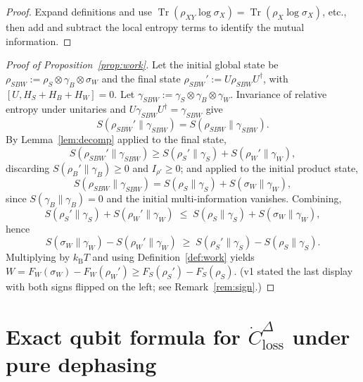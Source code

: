 \documentclass[11pt,a4paper]{article}
\theoremstyle{plain}
\theoremstyle{definition}
\theoremstyle{remark}
\newcommand{\Tr}{\operatorname{Tr}}
\newcommand{\kB}{k_{\mathrm{B}}}
\newcommand{\Closs}{\dot{C}^{\Delta}_{\mathrm{loss}}}
\begin{document}
\begin{proof}
Expand definitions and use
$\Tr(\rho_{XY}\log\sigma_X) = \Tr(\rho_X\log\sigma_X)$, etc., then add and
subtract the local entropy terms to identify the mutual information.
\end{proof}

\begin{proof}[Proof of Proposition~\ref{prop:work}]
Let the initial global state be $\rho_{SBW} := \rho_S \otimes \gamma_B \otimes
\sigma_W$ and the final state $\rho_{SBW}' := U\rho_{SBW}U^\dagger$, with
$[U, H_S + H_B + H_W] = 0$. Let $\gamma_{SBW} := \gamma_S \otimes \gamma_B
\otimes \gamma_W$. Invariance of relative entropy under unitaries and
$U\gamma_{SBW}U^\dagger = \gamma_{SBW}$ give
\begin{equation}
S(\rho_{SBW}'\|\gamma_{SBW}) = S(\rho_{SBW}\|\gamma_{SBW}).
\end{equation}
By Lemma~\ref{lem:decomp} applied to the final state,
\begin{equation}
S(\rho_{SBW}'\|\gamma_{SBW}) \ge S(\rho_S'\|\gamma_S) +
S(\rho_W'\|\gamma_W),
\end{equation}
discarding $S(\rho_B'\|\gamma_B) \ge 0$ and $I_{\rho'} \ge 0$; and applied to
the initial product state,
\begin{equation}
S(\rho_{SBW}\|\gamma_{SBW}) = S(\rho_S\|\gamma_S) + S(\sigma_W\|\gamma_W),
\end{equation}
since $S(\gamma_B\|\gamma_B) = 0$ and the initial multi-information vanishes.
Combining,
\begin{equation}
S(\rho_S'\|\gamma_S) + S(\rho_W'\|\gamma_W) \;\le\; S(\rho_S\|\gamma_S) +
S(\sigma_W\|\gamma_W),
\end{equation}
hence
\begin{equation}
S(\sigma_W\|\gamma_W) - S(\rho_W'\|\gamma_W) \;\ge\;
S(\rho_S'\|\gamma_S) - S(\rho_S\|\gamma_S).
\end{equation}
Multiplying by $\kB T$ and using Definition~\ref{def:work} yields
$W = F_W(\sigma_W) - F_W(\rho_W') \ge F_S(\rho_S') - F_S(\rho_S)$.
(v1 stated the last display with both signs flipped on the left; see
Remark~\ref{rem:sign}.)
\end{proof}

\section{Exact qubit formula for $\Closs$ under pure dephasing}
\label{app:qubit}
\end{document}

